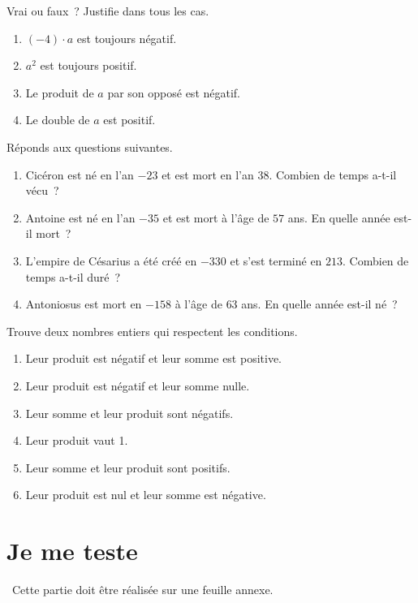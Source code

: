 \documentclass[../../syllabus_1.tex]{subfiles}
\begin{document}
\begin{exercise}
    Vrai ou faux~? Justifie dans tous les cas.
    \begin{enumerate}
        \item \(( - 4) \cdot a\) est toujours négatif.
        \item \(a^{2}\) est toujours positif.
        \item Le produit de \(a\) par son opposé est négatif.
        \item Le double de \(a\) est positif.
    \end{enumerate}
\end{exercise}

\begin{exercise}
    Réponds aux questions suivantes.
    \begin{enumerate}
        \item Cicéron est né en l'an \(- 23\) et est mort en l'an \(38\). Combien de temps a-t-il vécu~?
        \item Antoine est né en l'an \(- 35\) et est mort à l'âge de \(57\) ans. En quelle année est-il mort~?
        \item L'empire de Césarius a été créé en \(- 330\) et s'est terminé en \(213\). Combien de temps a-t-il duré~?
        \item Antoniosus est mort en \(- 158\) à l'âge de \(63\) ans. En quelle année est-il né~?
    \end{enumerate}
\end{exercise}

\begin{exercise}
    Trouve deux nombres entiers qui respectent les conditions.
    \begin{enumerate}
        \item Leur produit est négatif et leur somme est positive.
        \item Leur produit est négatif et leur somme nulle.
        \item Leur somme et leur produit sont négatifs.
        \item Leur produit vaut 1.
        \item Leur somme et leur produit sont positifs.
        \item Leur produit est nul et leur somme est négative.
    \end{enumerate}
\end{exercise}

\newpage
\section{Je me teste}
~Cette partie doit être réalisée sur une feuille annexe.
\setcounter{exercise}{0}
\end{document}
